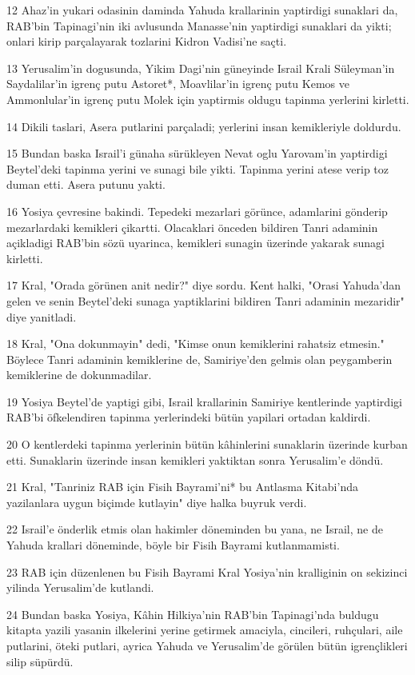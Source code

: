 \par 12 Ahaz'in yukari odasinin daminda Yahuda krallarinin yaptirdigi sunaklari da, RAB'bin Tapinagi'nin iki avlusunda Manasse'nin yaptirdigi sunaklari da yikti; onlari kirip parçalayarak tozlarini Kidron Vadisi'ne saçti.
\par 13 Yerusalim'in dogusunda, Yikim Dagi'nin güneyinde Israil Krali Süleyman'in Saydalilar'in igrenç putu Astoret*, Moavlilar'in igrenç putu Kemos ve Ammonlular'in igrenç putu Molek için yaptirmis oldugu tapinma yerlerini kirletti.
\par 14 Dikili taslari, Asera putlarini parçaladi; yerlerini insan kemikleriyle doldurdu.
\par 15 Bundan baska Israil'i günaha sürükleyen Nevat oglu Yarovam'in yaptirdigi Beytel'deki tapinma yerini ve sunagi bile yikti. Tapinma yerini atese verip toz duman etti. Asera putunu yakti.
\par 16 Yosiya çevresine bakindi. Tepedeki mezarlari görünce, adamlarini gönderip mezarlardaki kemikleri çikartti. Olacaklari önceden bildiren Tanri adaminin açikladigi RAB'bin sözü uyarinca, kemikleri sunagin üzerinde yakarak sunagi kirletti.
\par 17 Kral, "Orada görünen anit nedir?" diye sordu. Kent halki, "Orasi Yahuda'dan gelen ve senin Beytel'deki sunaga yaptiklarini bildiren Tanri adaminin mezaridir" diye yanitladi.
\par 18 Kral, "Ona dokunmayin" dedi, "Kimse onun kemiklerini rahatsiz etmesin." Böylece Tanri adaminin kemiklerine de, Samiriye'den gelmis olan peygamberin kemiklerine de dokunmadilar.
\par 19 Yosiya Beytel'de yaptigi gibi, Israil krallarinin Samiriye kentlerinde yaptirdigi RAB'bi öfkelendiren tapinma yerlerindeki bütün yapilari ortadan kaldirdi.
\par 20 O kentlerdeki tapinma yerlerinin bütün kâhinlerini sunaklarin üzerinde kurban etti. Sunaklarin üzerinde insan kemikleri yaktiktan sonra Yerusalim'e döndü.
\par 21 Kral, "Tanriniz RAB için Fisih Bayrami'ni* bu Antlasma Kitabi'nda yazilanlara uygun biçimde kutlayin" diye halka buyruk verdi.
\par 22 Israil'e önderlik etmis olan hakimler döneminden bu yana, ne Israil, ne de Yahuda krallari döneminde, böyle bir Fisih Bayrami kutlanmamisti.
\par 23 RAB için düzenlenen bu Fisih Bayrami Kral Yosiya'nin kralliginin on sekizinci yilinda Yerusalim'de kutlandi.
\par 24 Bundan baska Yosiya, Kâhin Hilkiya'nin RAB'bin Tapinagi'nda buldugu kitapta yazili yasanin ilkelerini yerine getirmek amaciyla, cincileri, ruhçulari, aile putlarini, öteki putlari, ayrica Yahuda ve Yerusalim'de görülen bütün igrençlikleri silip süpürdü.
